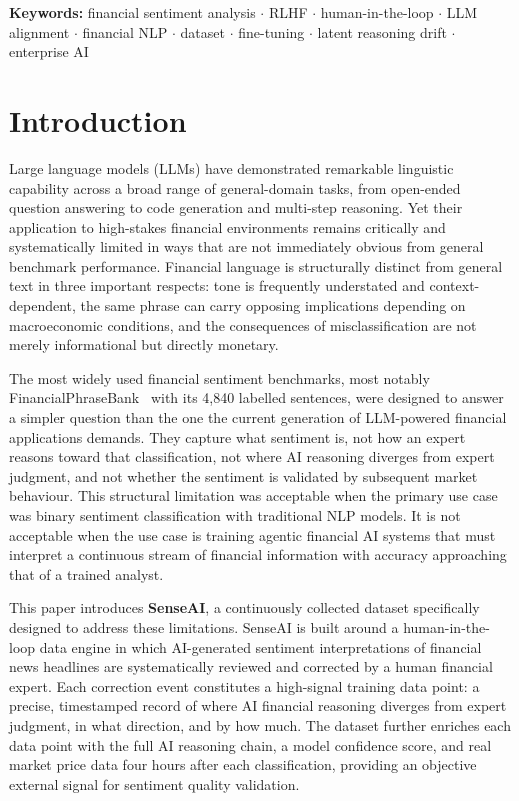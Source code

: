 \documentclass[11pt,a4paper]{article}
\begin{document}
\vspace{6pt}
\noindent\textbf{Keywords:} financial sentiment analysis $\cdot$ RLHF $\cdot$ human-in-the-loop
$\cdot$ LLM alignment $\cdot$ financial NLP $\cdot$ dataset $\cdot$ fine-tuning $\cdot$
latent reasoning drift $\cdot$ enterprise AI

\newpage
\tableofcontents
\newpage

\section{Introduction}
\label{sec:intro}

Large language models (LLMs) have demonstrated remarkable linguistic capability
across a broad range of general-domain tasks, from open-ended question answering
to code generation and multi-step reasoning. Yet their application to high-stakes
financial environments remains critically and systematically limited in ways that are
not immediately obvious from general benchmark performance. Financial language is
structurally distinct from general text in three important respects: tone is frequently
understated and context-dependent, the same phrase can carry opposing implications
depending on macroeconomic conditions, and the consequences of misclassification
are not merely informational but directly monetary.

The most widely used financial sentiment benchmarks, most notably
FinancialPhraseBank~\cite{malo2014good} with its 4,840 labelled sentences, were
designed to answer a simpler question than the one the current generation of
LLM-powered financial applications demands. They capture what sentiment is, not how
an expert reasons toward that classification, not where AI reasoning diverges from
expert judgment, and not whether the sentiment is validated by subsequent market
behaviour. This structural limitation was acceptable when the primary use case was
binary sentiment classification with traditional NLP models. It is not acceptable when
the use case is training agentic financial AI systems that must interpret a continuous
stream of financial information with accuracy approaching that of a trained analyst.

This paper introduces \textbf{SenseAI}, a continuously collected dataset specifically
designed to address these limitations. SenseAI is built around a human-in-the-loop
data engine in which AI-generated sentiment interpretations of financial news
headlines are systematically reviewed and corrected by a human financial expert.
Each correction event constitutes a high-signal training data point: a precise,
timestamped record of where AI financial reasoning diverges from expert judgment, in
what direction, and by how much. The dataset further enriches each data point with
the full AI reasoning chain, a model confidence score, and real market price data
four hours after each classification, providing an objective external signal for
sentiment quality validation.
\end{document}
